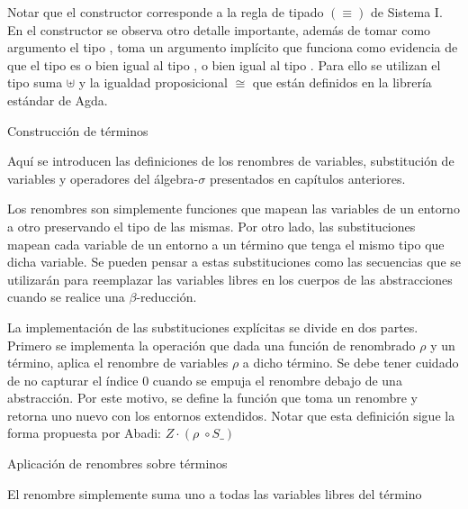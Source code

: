 Notar que el constructor \const{$[\_]\equiv\_$} corresponde a la regla de tipado $(\equiv)$ de Sistema I.
En el constructor \const{$\pi$} se observa otro detalle importante, además de tomar como argumento el tipo , toma un argumento implícito que funciona como evidencia de que el tipo  es o bien igual al tipo , o bien igual al tipo .
Para ello se utilizan el tipo suma $\uplus$ y la igualdad proposicional $\cong$ que están definidos en la librería estándar de Agda.

\begin{example}
	Construcción de términos
\end{example}

Aquí se introducen las definiciones de los renombres de variables, substitución de variables y operadores del álgebra-$\sigma$ presentados en capítulos anteriores.


Los renombres son simplemente funciones que mapean las variables de un entorno a otro preservando el tipo de las mismas.
Por otro lado, las substituciones mapean cada variable de un entorno a un término que tenga el mismo tipo que dicha variable.
Se pueden pensar a estas substituciones como las secuencias que se utilizarán para reemplazar las variables libres en los cuerpos de las abstracciones cuando se realice una $\beta$-reducción. 

La implementación de las substituciones explícitas se divide en dos partes.
Primero se implementa la operación  que dada una función de renombrado $\rho$ y un término, aplica el renombre de variables $\rho$ a dicho término.
Se debe tener cuidado de no capturar el índice 0 cuando se empuja el renombre debajo de una abstracción.
Por este motivo, se define la función  que toma un renombre y retorna uno nuevo con los entornos extendidos.
Notar que esta definición sigue la forma propuesta por Abadi: $Z \cdot (\rho \; \circ S\_)$

\begin{codigo}
	Aplicación de renombres sobre términos
\end{codigo}

\begin{example}
	El renombre  simplemente suma uno a todas las variables libres del término
\end{example}

